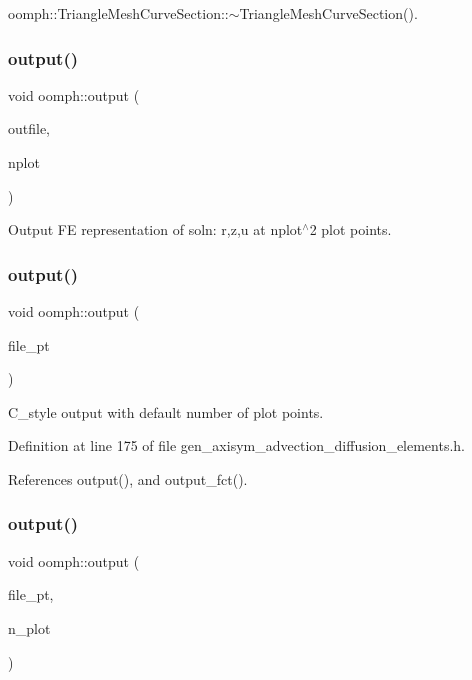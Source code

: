 oomph\+::\+Triangle\+Mesh\+Curve\+Section\+::$\sim$\+Triangle\+Mesh\+Curve\+Section().

\mbox{\label{namespaceoomph_ae53ff6c2852d72b8aa8801e40848e356}} 
\subsubsection{\texorpdfstring{output()}{output()}\hspace{0.1cm}{\footnotesize\ttfamily [2/4]}}
{\footnotesize\ttfamily void oomph\+::output (\begin{DoxyParamCaption}\item[{std\+::ostream \&}]{outfile,  }\item[{const unsigned \&}]{nplot }\end{DoxyParamCaption})}



Output FE representation of soln\+: r,z,u at nplot$^\wedge$2 plot points. 

\mbox{\label{namespaceoomph_a37b4754a63827566176ebfc2f3a2c601}} 
\subsubsection{\texorpdfstring{output()}{output()}\hspace{0.1cm}{\footnotesize\ttfamily [3/4]}}
{\footnotesize\ttfamily void oomph\+::output (\begin{DoxyParamCaption}\item[{F\+I\+LE $\ast$}]{file\+\_\+pt }\end{DoxyParamCaption})}



C\+\_\+style output with default number of plot points. 



Definition at line 175 of file gen\+\_\+axisym\+\_\+advection\+\_\+diffusion\+\_\+elements.\+h.



References output(), and output\+\_\+fct().

\mbox{\label{namespaceoomph_a3cb50c6adc7ee4a17c17a567b645f6db}} 
\subsubsection{\texorpdfstring{output()}{output()}\hspace{0.1cm}{\footnotesize\ttfamily [4/4]}}
{\footnotesize\ttfamily void oomph\+::output (\begin{DoxyParamCaption}\item[{F\+I\+LE $\ast$}]{file\+\_\+pt,  }\item[{const unsigned \&}]{n\+\_\+plot }\end{DoxyParamCaption})}



